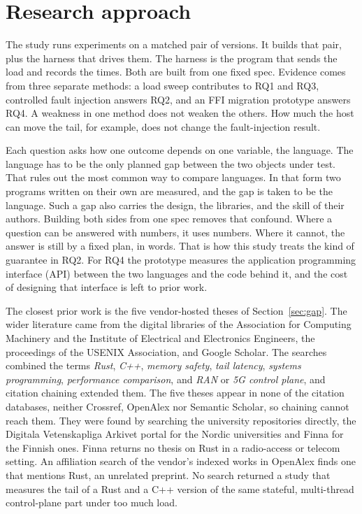 \documentclass[english,oneside,a4paper,censored,csm,software-track-2020]{HYthesisML}
\begin{document}
\FloatBarrier
      
\section{Research approach}\label{sec:approach}
The study runs experiments on a matched pair of versions. It builds that
pair, plus the harness that drives them. The harness is the program that sends
the load and records the times. Both are built from one
fixed spec. Evidence comes from three separate methods: a load sweep contributes to
RQ1 and RQ3, controlled fault injection answers RQ2, and an FFI migration
prototype answers RQ4. A weakness in one method does not weaken the others. How much the host can move the
tail, for example, does not change the fault-injection result.

Each question asks how one outcome depends on one variable, the language. The
language has to be the only planned gap between the two objects under test.
That rules out the most common way to compare languages. In that form two
programs written on their own are measured, and the gap is taken to be the
language. Such a gap also carries the design, the libraries, and the skill of
their authors. Building both sides from one spec removes that confound. Where
a question can be answered with numbers, it uses numbers. Where it cannot, the
answer is still by a fixed plan, in words. That is how this study treats the
kind of guarantee in RQ2. For RQ4 the prototype measures the application programming
interface (API) between the two languages and the code behind it, and the cost of designing
that interface is left to prior work.

The closest prior work is the five vendor-hosted theses of Section~\ref{sec:gap}.
The wider literature came from the digital libraries of the Association for Computing
Machinery and the Institute of Electrical and Electronics Engineers, the proceedings of the
USENIX Association, and Google Scholar. The searches combined the terms \emph{Rust},
\emph{C++}, \emph{memory safety}, \emph{tail latency}, \emph{systems programming},
\emph{performance comparison}, and \emph{RAN} or \emph{5G control plane}, and citation
chaining extended them. The five theses appear in none of the citation databases, neither
Crossref, OpenAlex nor Semantic Scholar, so chaining cannot reach them. They were found by
searching the university repositories directly, the Digitala Vetenskapliga Arkivet portal for
the Nordic universities and Finna for the Finnish ones. Finna returns no thesis on Rust in
a radio-access or telecom setting. An affiliation search of the vendor's indexed works in
OpenAlex finds one that mentions Rust, an unrelated preprint. No search returned a study
that measures the tail of a Rust and a C++ version of the same stateful, multi-thread
control-plane part under too much load.
\end{document}
